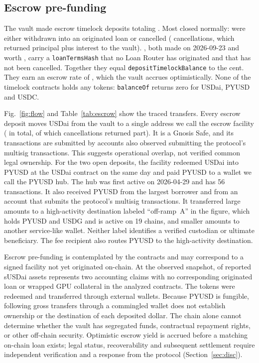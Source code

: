 \subsection{Escrow pre-funding}\label{sec:escrow}
The vault made \NEscrow{} escrow timelock deposits totaling \EscrowDeposits{}. Most closed normally: \NEscrowClosed{} were either withdrawn into an originated loan or cancelled (\NEscrowCancelled{} cancellations, which returned principal plus interest to the vault). \NEscrowOpen{}, both made on 2026-09-23 and worth \EscrowOpen{}, carry a \texttt{loanTermsHash} that no Loan Router has originated and that has not been cancelled. Together they equal \texttt{depositTimelockBalance} to the cent. They earn an escrow rate of \EscrowAPR{}, which the vault accrues optimistically. None of the timelock contracts holds any tokens: \texttt{balanceOf} returns zero for USDai, PYUSD and USDC.

Fig.~\ref{fig:flow} and Table~\ref{tab:escrow} show the traced transfers. Every escrow deposit moves USDai from the vault to a single address we call the escrow facility (\EscrowDeposits{} in total, of which cancellations returned part). It is a Gnosis Safe, and its transactions are submitted by accounts also observed submitting the protocol's multisig transactions. This suggests operational overlap, not verified common legal ownership. For the two open deposits, the facility redeemed USDai into PYUSD at the USDai contract on the same day and paid PYUSD to a wallet we call the PYUSD hub. The hub was first active on 2026-04-29 and has 56 transactions. It also received PYUSD from the largest borrower and from an account that submits the protocol's multisig transactions. It transferred large amounts to a high-activity destination labeled ``off-ramp~A'' in the figure, which holds PYUSD and USDG and is active on 19 chains, and smaller amounts to another service-like wallet. Neither label identifies a verified custodian or ultimate beneficiary. The fee recipient also routes PYUSD to the high-activity destination.

Escrow pre-funding is contemplated by the contracts and may correspond to a signed facility not yet originated on-chain. At the observed snapshot, \DTBalance{} of reported sUSDai assets represents two accounting claims with no corresponding originated loan or wrapped GPU collateral in the analyzed contracts. The tokens were redeemed and transferred through external wallets. Because PYUSD is fungible, following gross transfers through a commingled wallet does not establish ownership or the destination of each deposited dollar. The chain alone cannot determine whether the vault has segregated funds, contractual repayment rights, or other off-chain security. Optimistic escrow yield is accrued before a matching on-chain loan exists; legal status, recoverability and subsequent settlement require independent verification and a response from the protocol (Section~\ref{sec:disc}).

